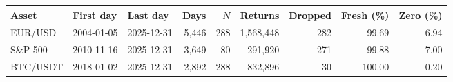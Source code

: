 \begin{tabular}{lllrrrrrr}
\toprule
Asset & First day & Last day & Days & $N$ & Returns & Dropped & Fresh (\%) & Zero (\%) \\
\midrule
EUR/USD & 2004-01-05 & 2025-12-31 & 5,446 & 288 & 1,568,448 & 282 & 99.69 & 6.94 \\
S\&P 500 & 2010-11-16 & 2025-12-31 & 3,649 & 80 & 291,920 & 271 & 99.88 & 7.00 \\
BTC/USDT & 2018-01-02 & 2025-12-31 & 2,892 & 288 & 832,896 & 30 & 100.00 & 0.20 \\
\bottomrule
\end{tabular}